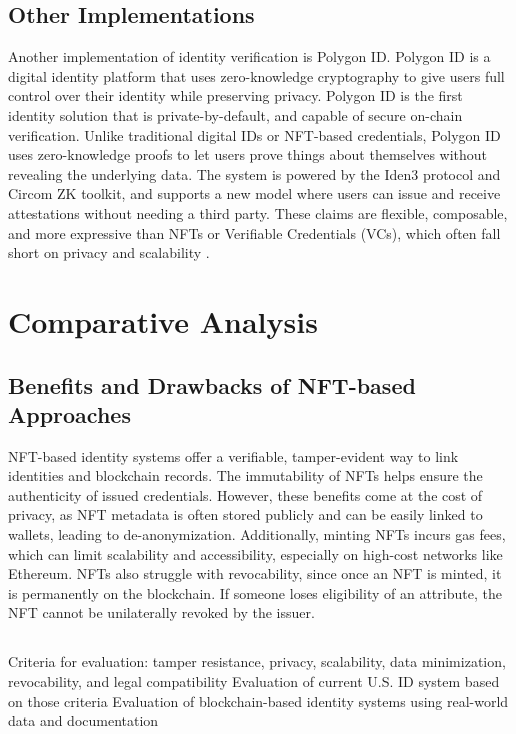 \documentclass[conference]{IEEEtran}
\begin{document}
\subsection{Other Implementations}
Another implementation of identity verification is Polygon ID. Polygon ID is a digital identity platform that uses zero-knowledge cryptography to give users full control over their identity while preserving privacy. Polygon ID is the first identity solution that is private-by-default, and capable of secure on-chain verification. Unlike traditional digital IDs or NFT-based credentials, Polygon ID uses zero-knowledge proofs to let users prove things about themselves without revealing the underlying data. The system is powered by the Iden3 protocol and Circom ZK toolkit, and supports a new model where users can issue and receive attestations without needing a third party. These claims are flexible, composable, and more expressive than NFTs or Verifiable Credentials (VCs), which often fall short on privacy and scalability \cite{polygon}.

\section{Comparative Analysis}

\subsection{Benefits and Drawbacks of NFT-based Approaches}
NFT-based identity systems offer a verifiable, tamper-evident way to link identities and blockchain records. The immutability of NFTs helps ensure the authenticity of issued credentials. However, these benefits come at the cost of privacy, as NFT metadata is often stored publicly and can be easily linked to wallets, leading to de-anonymization. Additionally, minting NFTs incurs gas fees, which can limit scalability and accessibility, especially on high-cost networks like Ethereum. NFTs also struggle with revocability, since once an NFT is minted, it is permanently on the blockchain. If someone loses eligibility of an attribute, the NFT cannot be unilaterally revoked by the issuer.

\subsection{}
Criteria for evaluation: tamper resistance, privacy, scalability, data minimization, revocability, and legal compatibility
Evaluation of current U.S. ID system based on those criteria
Evaluation of blockchain-based identity systems using real-world data and documentation
\end{document}

